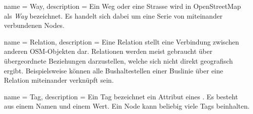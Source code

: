  {
	name = Way,
	description = {Ein Weg oder eine Strasse wird in OpenStreetMap als \emph{Way} bezeichnet. Es handelt sich dabei um eine Serie von miteinander verbundenen Nodes.}
}

 {
	name = Relation,
	description = {Eine Relation stellt eine Verbindung zwischen anderen OSM-Objekten dar. Relationen werden meist gebraucht über übergeordnete Beziehungen darzustellen, welche sich nicht direkt geografisch ergibt. Beispielsweise können alle Bushaltestellen einer Buslinie über eine Relation miteinander verknüpft sein.}
}

 {
	name = Tag,
	description = {Ein Tag bezeichnet ein Attribut eines . Es besteht aus einem Namen und einem Wert. Ein \gls{Node} kann beliebig viele Tags beinhalten.}
}